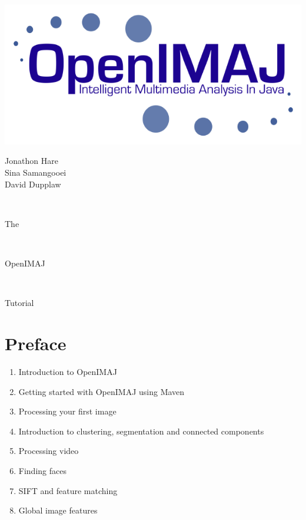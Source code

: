 \documentclass[10pt,a4paper,twoside,extrafontsizes]{memoir}
\newlength\titlepage
\newlength\titlepagefull
\begin{document}
	
\pagestyle{empty}

\begin{minipage}{0.5\titlepage}
\includegraphics{OpenIMAJ.png}
\end{minipage}
\hspace{0.001pt}
\begin{minipage}{0.5\titlepage}
\Huge
\flushright
Jonathon Hare\\
Sina Samangooei\\
David Dupplaw
\end{minipage}
\\[10cm]
\begin{minipage}{\titlepage}
\fontsize{60}{100}\selectfont\flushright The
\end{minipage}
\\[1cm]
\colorbox{nicered}{\parbox{\titlepagefull}{
	\parbox{\titlepage}{
		\color{white}\fontsize{80}{120}\selectfont\flushright OpenIMAJ\\[0.4cm]}
	}
}
\\[0.8cm]
\begin{minipage}{\titlepage}
\fontsize{60}{100}\selectfont\flushright Tutorial
\end{minipage}
\cleardoublepage


\tableofcontents*

\chapter*{Preface}\normalsize
{}
\pagestyle{plain}

\begin{enumerate}
	\item Introduction to OpenIMAJ
	\item Getting started with OpenIMAJ using Maven
	\item Processing your first image
	\item Introduction to clustering, segmentation and connected components
	\item Processing video
	\item Finding faces
	\item SIFT and feature matching
	\item Global image features
\end{enumerate}
\end{document}

